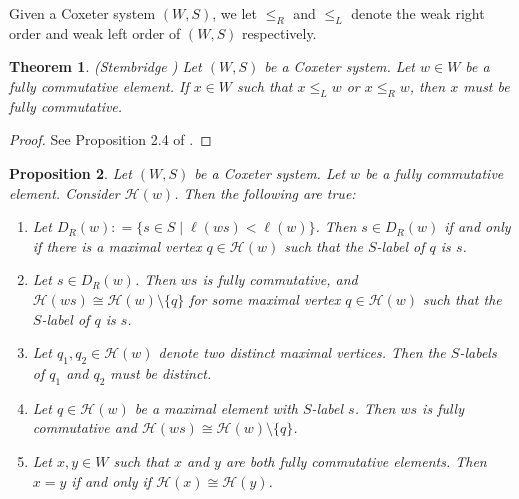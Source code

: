 \documentclass{amsart}
\theoremstyle{plain} %
\newtheorem{thm}{Theorem}[section]
\newtheorem{prop}[thm]{Proposition}
\theoremstyle{definition}
\def\weakr{\leq_{R}}
\def\weakl{\leq_{L}}
\def\H#1{\mathcal{H}(#1)}
\begin{document}
Given a Coxeter system $ (W,S)$, we let $ \weakr $ and $ \weakl$ denote the weak right order and weak left order of $ (W,S)$ respectively.

\begin{thm}{(Stembridge \cite{stembridge1996fully})} \label{fullcommweakorderthm}
    Let $ (W,S)$ be a Coxeter system. Let $ w \in W$ be a fully commutative element. If $ x\in W$ such that $ x \weakl w $ or $ x\weakr w$, then $x$ must be fully commutative.
\end{thm}

\begin{proof}
    See Proposition 2.4 of \cite{stembridge1996fully}.    
\end{proof}


\begin{prop} \label{removemaxprop}
    Let $ (W,S)$ be a Coxeter system. Let $ w$ be a fully commutative element. Consider $\H{w}$. Then the following are true:

    \begin{enumerate}
        \item Let $ D_{R}(w) : = \{ s\in S \mid \ell(ws) < \ell(w)  \}$.
        Then $ s\in D_{R}(w)$ if and only if there is a maximal vertex $ q\in \H{w}$ such that the $S$-label of $ q$ is $s$.

        \item Let $ s\in D_{R}(w)$. Then $ ws$ is fully commutative, and $ \H{ws}\cong \H{w} \setminus \{ q \}$ for some maximal vertex $q\in \H{w}$ such that the $S$-label of $q$ is $s$.

        \item Let $ q_{1}, q_{2} \in \H{w}$ denote two distinct maximal vertices. Then the $S$-labels of $ q_{1}$ and $q_{2}$ must be distinct.

        \item Let $ q \in \H{w}$ be a maximal element with $ S$-label $s$. Then $ ws$ is fully commutative and $ \H{ws} \cong \H{w} \setminus \{ q  \}$.

        \item Let $ x,y\in W$ such that $ x$ and $ y$ are both fully commutative elements. Then $ x=y$ if and only if $ \H{x} \cong \H{y}$.
    \end{enumerate}
\end{prop}
\end{document}
